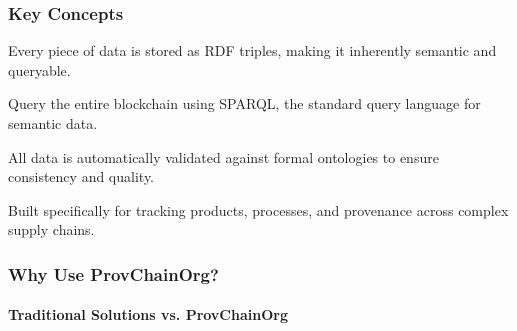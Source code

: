 \documentclass[letterpaper,10pt,english]{sphinxmanual}
\begin{document}
\subsubsection{Key Concepts}
\label{\detokenize{foundational/intro-to-provchainorg:key-concepts}}\begin{description}
\sphinxAtStartPar
Every piece of data is stored as RDF triples, making it inherently semantic and queryable.

\sphinxAtStartPar
Query the entire blockchain using SPARQL, the standard query language for semantic data.

\sphinxAtStartPar
All data is automatically validated against formal ontologies to ensure consistency and quality.

\sphinxAtStartPar
Built specifically for tracking products, processes, and provenance across complex supply chains.

\end{description}


\subsubsection{Why Use ProvChainOrg?}
\label{\detokenize{foundational/intro-to-provchainorg:why-use-provchainorg}}

\paragraph{Traditional Solutions vs. ProvChainOrg}
\label{\detokenize{foundational/intro-to-provchainorg:traditional-solutions-vs-provchainorg}}
\end{document}
